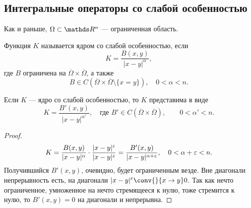 \subsection{Интегральные операторы со слабой особенностью}
Как и раньше, $\Omega \subset \real^n$ --- ограниченная область.

\begin{definition} Функция $K$ называется ядром со слабой особенностью, если
$$ K = \frac {B(x,y)} {|x-y|^\alpha},$$
где $B$ ограничена на $\overline{\Omega} \times \overline{\Omega}$, а также
$$B \in C(\overline{\Omega} \times \overline{\Omega} \setminus \{ x = y \}), \quad 0 < \alpha < n.$$
\end{definition}

\begin{note} Если $K$ --- ядро со слабой особенностью, то $K$ представима в виде
$$ K = \frac {B'(x,y)} {|x-y|^{\alpha'}}, \quad \text{где } B' \in C(\overline{\Omega} \times \overline{\Omega}), \quad \quad 0 < \alpha' < n.$$
\end{note}
\begin{proof}
$$ K = \frac {B(x,y)} {|x-y|^\alpha} \cdot \frac {|x-y|^\varepsilon} {|x-y|^\varepsilon} = \frac {B'(x,y)} {|x-y|^{\alpha + \varepsilon}}, \quad 0 < \alpha + \varepsilon < n.$$
Получившийся $B'(x,y)$, очевидно, будет ограниченным везде. Вне диагонали непрерывность есть, на диагонали $\displaystyle |x-y|^\eps \conv{}{x \to y} 0$. Так как нечто ограниченное, умноженное на нечто стремящееся к нулю, тоже стремится к нулю, то $B'(x,y) = 0$ на диагонали и непрерывна.

\end{proof}

